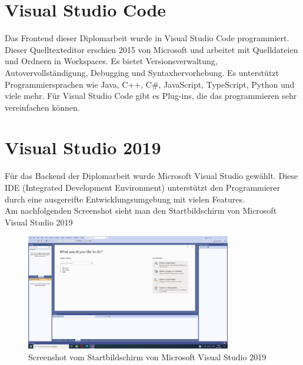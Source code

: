 \section{Visual Studio Code}
Das Frontend dieser Diplomarbeit wurde in Visual Studio Code programmiert. Dieser Quelltexteditor erschien 2015 von Microsoft und arbeitet mit Quelldateien und Ordnern in Workspaces. Es bietet Versionsverwaltung, Autovervollständigung, Debugging und Syntaxhervorhebung. Es unterstützt Programmiersprachen wie Java, C++, C\#, JavaScript, TypeScript, Python und viele mehr. Für Visual Studio Code gibt es Plug-ins, die das programmieren sehr vereinfachen können. \autocite{wikiVisualStudioCode}

\section{Visual Studio 2019}

Für das Backend der Diplomarbeit wurde Microsoft Visual Studio gewählt. Diese IDE (Integrated Development Environment) unterstützt den Programmierer durch eine ausgereifte Entwicklungsumgebung mit vielen Features.\\

Am nachfolgenden Screenshot sieht man den Startbildschirm von Microsoft Visual Studio 2019
\begin{figure}[h]
	\centerline{
	\includegraphics[width=0.8\textwidth]{./grafiken/visual_studio_startview.png}
	}
	\vskip0pt
	\caption{Screenshot vom Startbildschirm von Microsoft Visual Studio 2019} \label{fig:visualStudioStartview}
\end{figure}

